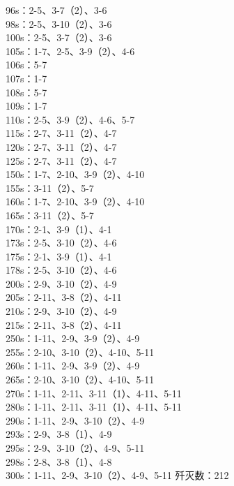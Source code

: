 \documentclass[a4paper,12pt]{article}
\begin{document}
		\indent 96s：2-5、3-7（2）、3-6\\
		\indent 98s：2-5、3-10（2）、3-6\\
		\indent 100s：2-5、3-7（2）、3-6\\
		\indent 105s：1-7、2-5、3-9（2）、4-6\\
		\indent 106s：5-7\\
		\indent 107s：1-7\\
		\indent 108s：5-7\\
		\indent 109s：1-7\\
		\indent 110s：2-5、3-9（2）、4-6、5-7\\
		\indent 115s：2-7、3-11（2）、4-7\\
		\indent 120s：2-7、3-11（2）、4-7\\
		\indent 125s：2-7、3-11（2）、4-7\\
		\indent 150s：1-7、2-10、3-9（2）、4-10\\
		\indent 155s：3-11（2）、5-7\\
		\indent 160s：1-7、2-10、3-9（2）、4-10\\
		\indent 165s：3-11（2）、5-7\\
		\indent 170s：2-1、3-9（1）、4-1\\
		\indent 173s：2-5、3-10（2）、4-6\\
		\indent 175s：2-1、3-9（1）、4-1\\
		\indent 178s：2-5、3-10（2）、4-6\\
		\indent 200s：2-9、3-10（2）、4-9\\
		\indent 205s：2-11、3-8（2）、4-11\\
		\indent 210s：2-9、3-10（2）、4-9\\
		\indent 215s：2-11、3-8（2）、4-11\\
		\indent 250s：1-11、2-9、3-9（2）、4-9\\
		\indent 255s：2-10、3-10（2）、4-10、5-11\\
		\indent 260s：1-11、2-9、3-9（2）、4-9\\
		\indent 265s：2-10、3-10（2）、4-10、5-11\\
		\indent 270s：1-11、2-11、3-11（1）、4-11、5-11\\
		\indent 280s：1-11、2-11、3-11（1）、4-11、5-11\\
		\indent 290s：1-11、2-9、3-10（2）、4-9\\
		\indent 293s：2-9、3-8（1）、4-9\\
		\indent 295s：2-9、3-10（2）、4-9、5-11\\
		\indent 298s：2-8、3-8（1）、4-8\\
		\indent 300s：1-11、2-9、3-10（2）、4-9、5-11
		\indent 歼灭数：212
\end{document}
